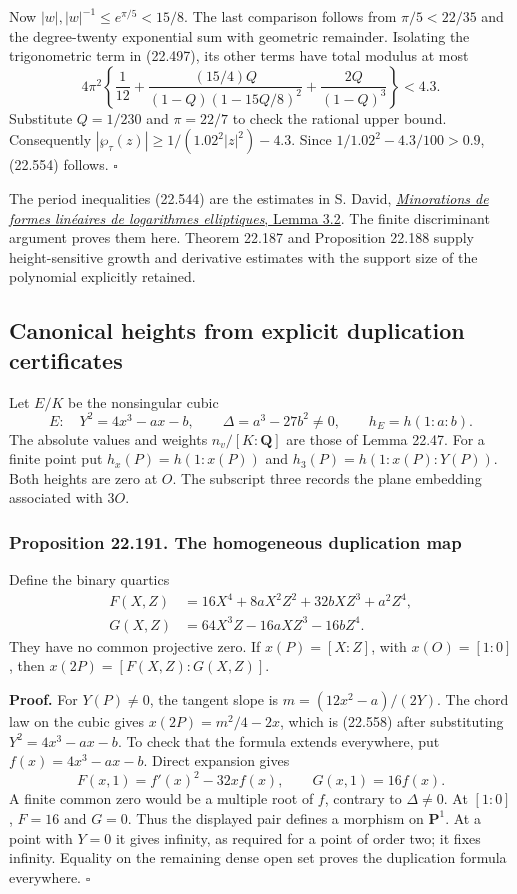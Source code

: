 \documentclass[
  11pt,
  a4paper,
]{article}
\begin{document}
Now \(|w|,|w|^{-1}\le e^{\pi/5}<15/8\). The last comparison follows from
\(\pi/5<22/35\) and the degree-twenty exponential sum with geometric
remainder. Isolating the trigonometric term in (22.497), its other terms
have total modulus at most \[
 4\pi^2\left\{\frac1{12}
 +\frac{(15/4)Q}{(1-Q)(1-15Q/8)^2}
 +\frac{2Q}{(1-Q)^3}\right\}<4.3.
 \tag{22.556}
\] Substitute \(Q=1/230\) and \(\pi=22/7\) to check the rational upper
bound. Consequently \(|\wp_\tau(z)|\ge1/(1.02^2|z|^2)-4.3\). Since
\(1/1.02^2-4.3/100>0.9\), (22.554) follows. \(\square\)

The period inequalities (22.544) are the estimates in S. David,
\href{https://smf.emath.fr/system/files/filepdf/MSMF_1995_2_62__1_0.pdf}{\emph{Minorations
de formes linéaires de logarithmes elliptiques}, Lemma 3.2}. The finite
discriminant argument proves them here. Theorem 22.187 and Proposition
22.188 supply height-sensitive growth and derivative estimates with the
support size of the polynomial explicitly retained.

\subsection{Canonical heights from explicit duplication
certificates}\label{canonical-heights-from-explicit-duplication-certificates}

Let \(E/K\) be the nonsingular cubic \[
 E:\quad Y^2=4x^3-ax-b,\qquad \Delta=a^3-27b^2\ne0,
 \qquad h_E=h(1:a:b).
 \tag{22.557}
\] The absolute values and weights \(n_v/[K:\mathbf Q]\) are those of
Lemma 22.47. For a finite point put \(h_x(P)=h(1:x(P))\) and
\(h_3(P)=h(1:x(P):Y(P))\). Both heights are zero at \(O\). The subscript
three records the plane embedding associated with \(3O\).

\subsubsection{Proposition 22.191. The homogeneous duplication
map}\label{proposition-22.191.-the-homogeneous-duplication-map}

Define the binary quartics \[
 \begin{split}
 F(X,Z)&=16X^4+8aX^2Z^2+32bXZ^3+a^2Z^4,\\
 G(X,Z)&=64X^3Z-16aXZ^3-16bZ^4.
 \end{split}
 \tag{22.558}
\] They have no common projective zero. If \(x(P)=[X:Z]\), with
\(x(O)=[1:0]\), then \(x(2P)=[F(X,Z):G(X,Z)]\).

\textbf{Proof.} For \(Y(P)\ne0\), the tangent slope is
\(m=(12x^2-a)/(2Y)\). The chord law on the cubic gives
\(x(2P)=m^2/4-2x\), which is (22.558) after substituting
\(Y^2=4x^3-ax-b\). To check that the formula extends everywhere, put
\(f(x)=4x^3-ax-b\). Direct expansion gives \[
 F(x,1)=f'(x)^2-32xf(x),\qquad G(x,1)=16f(x).
 \tag{22.559}
\] A finite common zero would be a multiple root of \(f\), contrary to
\(\Delta\ne0\). At \([1:0]\), \(F=16\) and \(G=0\). Thus the displayed
pair defines a morphism on \(\mathbf P^1\). At a point with \(Y=0\) it
gives infinity, as required for a point of order two; it fixes infinity.
Equality on the remaining dense open set proves the duplication formula
everywhere. \(\square\)
\end{document}
